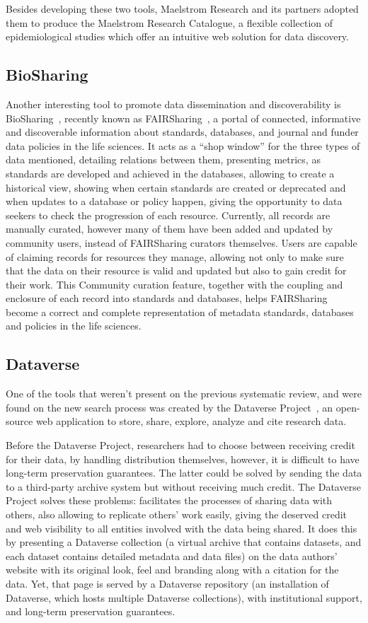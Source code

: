 Besides developing these two tools, Maelstrom Research and its partners adopted them to produce the Maelstrom Research Catalogue, a flexible collection of epidemiological studies which offer an intuitive web solution for data discovery.

\subsection*{BioSharing}
Another interesting tool to promote data dissemination and discoverability is BioSharing~\cite{biosharing}, recently known as FAIRSharing~\cite{fairsharing}, a portal of connected, informative and discoverable information about standards, databases, and journal and funder data policies in the life sciences.
It acts as a ``shop window'' for the three types of data mentioned, detailing relations between them, presenting metrics, as standards are developed and achieved in the databases, allowing to create a historical view, showing when certain standards are created or deprecated and when updates to a database or policy happen, giving the opportunity to data seekers to check the progression of each resource.
Currently, all records are manually curated, however many of them have been added and updated by community users, instead of FAIRSharing curators themselves.
Users are capable of claiming records for resources they manage, allowing not only to make sure that the data on their resource is valid and updated but also to gain credit for their work.
This Community curation feature, together with the coupling and enclosure of each record into standards and databases, helps FAIRSharing become a correct and complete representation of metadata standards, databases and policies in the life sciences.

\subsection*{Dataverse}
One of the tools that weren't present on the previous systematic review, and were found on the new search process was created by the Dataverse Project~\cite{dataverse}, an open-source web application to store, share, explore, analyze and cite research data.

Before the Dataverse Project, researchers had to choose between receiving credit for their data, by handling distribution themselves, however, it is difficult to have long-term preservation guarantees.
The latter could be solved by sending the data to a third-party archive system but without receiving much credit.
The Dataverse Project solves these problems: facilitates the processes of sharing data with others, also allowing to replicate others' work easily, giving the deserved credit and web visibility to all entities involved with the data being shared.
It does this by presenting a Dataverse collection (a virtual archive that contains datasets, and each dataset contains detailed metadata and data files) on the data authors' website with its original look, feel and branding along with a citation for the data.
Yet, that page is served by a Dataverse repository (an installation of Dataverse, which hosts multiple Dataverse collections), with institutional support, and long-term preservation guarantees.

